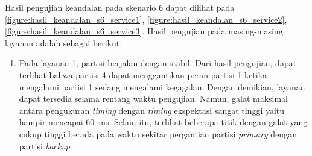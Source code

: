 \begin{enumerate}
		Hasil pengujian keandalan pada skenario 6 dapat dilihat pada
		\autoref{figure:hasil_keandalan_s6_service1},
		\autoref{figure:hasil_keandalan_s6_service2},
		\autoref{figure:hasil_keandalan_s6_service3}.  Hasil pengujian pada
		masing-masing layanan adalah sebagai berikut.
		
		\begin{enumerate}

			\item Pada layanan 1, partisi berjalan
				dengan stabil.  Dari hasil pengujian, dapat terlihat bahwa partisi 4 dapat
				menggantikan peran partisi 1 ketika mengalami partisi 1 sedang mengalami
				kegagalan. Dengan demikian, layanan dapat tersedia selama rentang waktu
				pengujian. Namun, galat maksimal antara pengukuran \textit{timing} dengan
				\textit{timing} ekspektasi sangat tinggi yaitu hampir mencapai
				\SI{60}{\milli\second}. Selain itu, terlihat beberapa titik dengan galat yang
				cukup tinggi berada pada waktu sekitar pergantian partisi \textit{primary}
				dengan partisi \textit{backup}.


\end{enumerate}
\end{enumerate}
